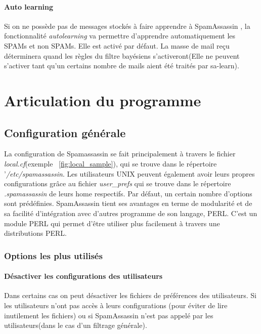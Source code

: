 \documentclass[a4paper,11pt]{article}
\begin{document}
\paragraph*{Auto learning}
Si on ne possède pas de messages stockés à faire apprendre à SpamAssassin , la fonctionnalité \emph{autolearning}
va permettre d'apprendre automatiquement les SPAMs et non SPAMs. Elle est activé par défaut. La masse de mail 
reçu déterminera quand les règles du filtre bayésiens s'activeront(Elle ne peuvent s'activer tant qu'un certains nombre de mails aient été traités par sa-learn).



\section{Articulation du programme}

\subsection{Configuration générale}



La configuration de Spamassassin se fait principalement à travers le fichier \emph{local.cf}(exemple ~\ref{fig:local_sample}), qui se trouve dans le 
répertoire '\emph{/etc/spamassassin}.
Les utilisateurs UNIX peuvent également avoir leurs propres configurations grâce au fichier \emph{user\_prefs}
qui se trouve dans le répertoire \emph{.spamassassin} de leurs home respectifs. 
Par défaut, un certain nombre d’options sont prédéfinies. 
\linebreak
SpamAssassin tient ses avantages en terme de modularité et de sa facilité d'intégration avec d'autres programme de son langage, PERL.
C'est un module PERL qui permet d'être utiliser plus facilement à travers une distributions PERL. 

\subsubsection{Options les plus utilisés}
\paragraph{Désactiver les configurations des utilisateurs}
Dans certains cas on peut désactiver les fichiers de préférences des utilisateurs. Si les utilisateurs n'ont pas accès à leurs configurations 
(pour éviter de lire inutilement les fichiers) ou si SpamAssassin n'est pas appelé par les utilisateurs(dans le cas d'un filtrage générale).
\end{document}
